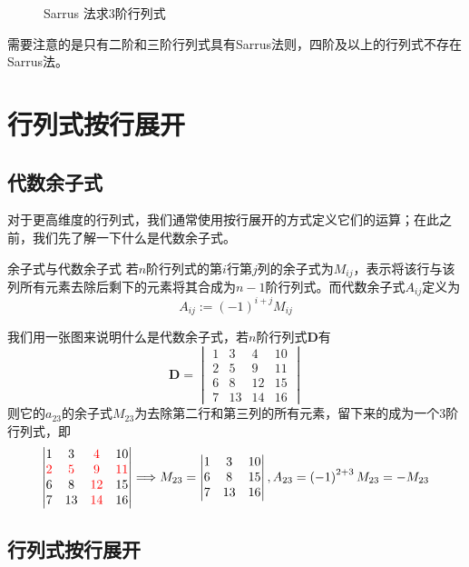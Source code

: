\begin{figure}[htbp]
	\centering
	
	\caption{Sarrus 法求3阶行列式}
	\label{tikz:SarrusRule}
\end{figure}

需要注意的是只有二阶和三阶行列式具有Sarrus法则，四阶及以上的行列式不存在Sarrus法。

\section{行列式按行展开}

\subsection{代数余子式}

对于更高维度的行列式，我们通常使用按行展开的方式定义它们的运算；在此之前，我们先了解一下什么是代数余子式。

\begin{definition}{余子式与代数余子式}
	若$n$阶行列式的第$i$行第$j$列的余子式为$M_{ij}$，表示将该行与该列所有元素去除后剩下的元素将其合成为$n-1$阶行列式。而代数余子式$A_{ij}$定义为$$A_{ij}:=\left( -1 \right)^{i+j}M_{ij}$$
\end{definition}

我们用一张图来说明什么是代数余子式，若$n$阶行列式$\mathbf{D}$有$$\mathbf{D}=\begin{vmatrix}
	1 & 3 & 4 & 10\\
	2 & 5 & 9 & 11\\
	6 & 8 & 12 & 15\\
	7 & 13 & 14 & 16
\end{vmatrix}$$则它的$a_{23}$的余子式$M_{23}$为去除第二行和第三列的所有元素，留下来的成为一个3阶行列式，即$$\begin{vmatrix}
	1 & 3 & \textcolor{red}{4} & 10\\
	\textcolor{red}{2} & \textcolor{red}{5} & \textcolor{red}{9} & \textcolor{red}{11}\\
	6 & 8 & \textcolor{red}{12} & 15\\
	7 & 13 & \textcolor{red}{14} & 16
\end{vmatrix} \Longrightarrow M_{23}=\begin{vmatrix}
	1 & 3 & 10\\
	6 & 8 & 15\\
	7 & 13 & 16
\end{vmatrix},A_{23}=\left( -1 \right)^{2+3}M_{23}=-M_{23}$$

\subsection{行列式按行展开}

